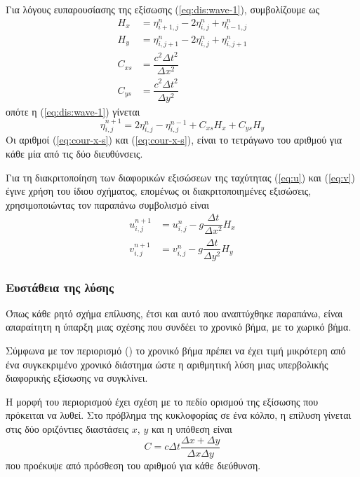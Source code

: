Για λόγους ευπαρουσίασης της εξίσωσης (\ref{eq:dis:wave-1}), συμβολίζουμε ως
\begin{align}
    H_{x} &= η_{i+1,j}^{n} - 2 η_{i,j}^{n} + η_{i-1,j}^{n} \\
    H_{y} &= η_{i,j+1}^{n} - 2 η_{i,j}^{n} + η_{i,j+1}^{n} \\
    C_{xs} &= \dfrac{c^2 Δt^2}{Δx^2} \label{eq:cour-x-s}\\
    C_{ys} &= \dfrac{c^2 Δt^2}{Δy^2} \label{eq:cour-y-s}
\end{align}
οπότε η (\ref{eq:dis:wave-1}) γίνεται
\begin{equation}
    η_{i,j}^{n+1} = 2 η_{i,j}^{n} - η_{i,j}^{n-1} + C_{xs} H_{x} + C_{ys} H_{y}
    \label{eq:dis:wave}
\end{equation}
Οι αριθμοί (\ref{eq:cour-x-s}) και (\ref{eq:cour-x-s}), είναι το τετράγωνο του αριθμού  για κάθε μία από τις δύο διευθύνσεις.

Για τη διακριτοποίηση των διαφορικών εξισώσεων της ταχύτητας (\ref{eq:u}) και (\ref{eq:v}) έγινε χρήση του ίδιου σχήματος, επομένως οι διακριτοποιημένες εξισώσεις, χρησιμοποιώντας τον παραπάνω συμβολισμό είναι
\begin{align}
    u_{i,j}^{n+1} &= u_{i,j}^{n} - g \dfrac{Δt}{Δx^2}H_x \label{eq:dis:u}\\
    v_{i,j}^{n+1} &= v_{i,j}^{n} - g \dfrac{Δt}{Δy^2}H_y \label{eq:dis:v}
\end{align} 
\subsubsection{Ευστάθεια της λύσης}
Όπως κάθε ρητό σχήμα επίλυσης, έτσι και αυτό που αναπτύχθηκε παραπάνω, είναι απαραίτητη η ύπαρξη μιας σχέσης που συνδέει το χρονικό βήμα, με το χωρικό βήμα.

Σύμφωνα με τον περιορισμό  (\textbf{}) το χρονικό βήμα πρέπει να έχει τιμή μικρότερη από ένα συγκεκριμένο χρονικό διάστημα ώστε η αριθμητική λύση μιας υπερβολικής διαφορικής εξίσωσης να συγκλίνει.

Η μορφή του περιορισμού  έχει σχέση με το πεδίο ορισμού της εξίσωσης που πρόκειται να λυθεί. Στο πρόβλημα της κυκλοφορίας σε ένα κόλπο, η επίλυση γίνεται στις δύο οριζόντιες διαστάσεις $x$, $y$ και η υπόθεση είναι 
\begin{equation}
    C = c Δt \dfrac{Δx + Δy}{Δx Δy}
\end{equation}
που προέκυψε από πρόσθεση του αριθμού  για κάθε διεύθυνση.

